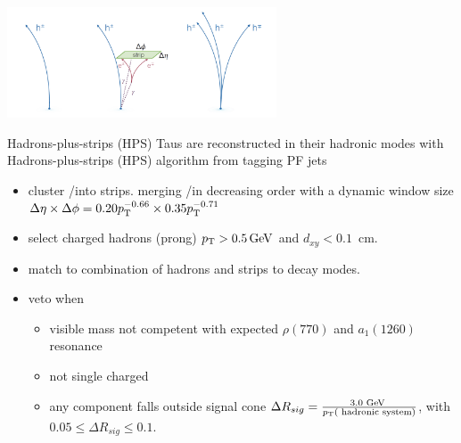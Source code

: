 \begin{frame}{}
\smaller
    \begin{center}
        \includegraphics[width=0.6\textwidth]{slides/figures/tauReco.png}
    \end{center}
    \begin{block}{Hadrons-plus-strips (HPS)}
    Taus are reconstructed in their hadronic modes with Hadrons-plus-strips (HPS) algorithm from tagging PF jets
    \begin{itemize} 
        \item cluster \Pe/\PGg into strips. merging \Pe/\PGg in \pt decreasing order with a dynamic window size $\Delta\eta \times \Delta \phi = 0.20p_{\mathrm{T}}^{-0.66} \times 0.35 p_{\mathrm{T}}^{-0.71}$ 
        \item select charged hadrons (prong) $p_{\mathrm{T}}>0.5\,\text{Ge\hspace{-.08em}V}$ and $d_{xy}<0.1$~cm.
        \item match to combination of hadrons and strips to \PGth decay modes.
        \item veto when
        \begin{itemize} 
        \smaller
            \item visible mass not competent with expected $\rho (770)$ and $a_1(1260)$ resonance
            \item not single charged
            \item any component falls outside signal cone $\Delta R_{sig} = \frac{3.0 \text{ GeV } } { p_{\mathrm{T}} (\text{ hadronic system})  }$, with $0.05 \leq \Delta R_{sig} \leq 0.1.$
        \end{itemize}
    \end{itemize}  
    \end{block}
\end{frame}


